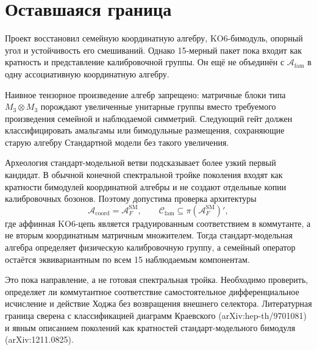 \section{Оставшаяся граница}

Проект восстановил семейную координатную алгебру, KO6-бимодуль, опорный
угол и устойчивость его смешиваний. Однако 15-мерный пакет пока входит как
кратность и представление калибровочной группы. Он ещё не объединён с
$\mathcal A_{\mathrm{fam}}$ в одну ассоциативную координатную алгебру.

Наивное тензорное произведение алгебр запрещено: матричные блоки типа
$M_3\otimes M_3$ порождают увеличенные унитарные группы вместо требуемого
произведения семейной и наблюдаемой симметрий. Следующий гейт должен
классифицировать амальгамы или бимодульные размещения, сохраняющие старую
алгебру Стандартной модели без такого увеличения.

Археология стандарт-модельной ветви подсказывает более узкий первый
кандидат. В обычной конечной спектральной тройке поколения входят как
кратности бимодулей координатной алгебры и не создают отдельные копии
калибровочных бозонов. Поэтому допустима проверка архитектуры
\begin{equation}
 \mathcal A_{\mathrm{coord}}=\mathcal A_F^{\mathrm{SM}},
 \qquad
 \mathcal C_{\mathrm{fam}}
 \subseteq\pi(\mathcal A_F^{\mathrm{SM}})',
 \label{eq:v5-affine-commutant-route}
\end{equation}
где аффинная KO6-цепь является градуированным соответствием в коммутанте,
а не вторым координатным матричным множителем. Тогда стандарт-модельная
алгебра определяет физическую калибровочную группу, а семейный оператор
остаётся эквивариантным по всем 15 наблюдаемым компонентам.

Это пока направление, а не готовая спектральная тройка. Необходимо
проверить, определяет ли коммутантное соответствие самостоятельное
дифференциальное исчисление и действие Ходжа без возвращения внешнего
селектора. Литературная граница сверена с классификацией диаграмм
Краевского (arXiv:hep-th/9701081) и явным описанием поколений как
кратностей стандарт-модельного бимодуля (arXiv:1211.0825).

